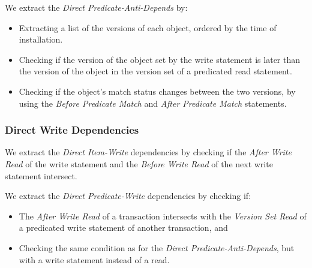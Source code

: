 We extract the \textit{Direct Predicate-Anti-Depends} by:
\begin{itemize}
    \item Extracting a list of the versions of each object, ordered by the time of installation.
    \item Checking if the version of the object set by the write statement is later than the version of the object in the version set of a predicated read statement.
    \item Checking if the object's match status changes between the two versions, by using the \textit{Before Predicate Match} and \textit{After Predicate Match} statements.
\end{itemize}

\subsubsection{Direct Write Dependencies}

We extract the \textit{Direct Item-Write} dependencies by checking if the \textit{After Write Read} of the write statement and the \textit{Before Write Read} of the next write statement intersect.

We extract the \textit{Direct Predicate-Write} dependencies by checking if:
\begin{itemize}
    \item The \textit{After Write Read} of a transaction intersects with the \textit{Version Set Read} of a predicated write statement of another transaction, and
    \item Checking the same condition as for the \textit{Direct Predicate-Anti-Depends}, but with a write statement instead of a read.
\end{itemize}
